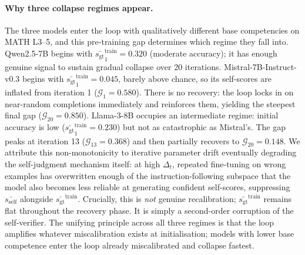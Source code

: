 \documentclass{article}
\newcommand{\gap}{\mathcal{G}}          %
\newcommand{\self}{s_{\text{self}}}     %
\newcommand{\gt}{s_{\text{gt}}}         %
\begin{document}
\paragraph{Why three collapse regimes appear.}
The three models enter the loop with qualitatively different base competencies
on MATH L3--5, and this pre-training gap determines which regime they fall into.
Qwen2.5-7B begins with $\bar{\gt}^\text{train}_1 = 0.320$ (moderate accuracy);
it has enough genuine signal to sustain gradual collapse over 20 iterations.
Mistral-7B-Instruct-v0.3 begins with $\bar{\gt}^\text{train}_1 = 0.045$, barely
above chance, so its self-scores are inflated from iteration 1 ($\gap_1 = 0.580$).
There is no recovery: the loop locks in on near-random completions immediately
and reinforces them, yielding the steepest final gap ($\gap_{20} = 0.850$).
Llama-3-8B occupies an intermediate regime: initial accuracy is low
($\bar{\gt}^\text{train}_1 = 0.230$) but not as catastrophic as Mistral's.
The gap peaks at iteration 13 ($\gap_{13} = 0.368$) and then partially recovers
to $\gap_{20} = 0.148$.
We attribute this non-monotonicity to iterative parameter drift eventually degrading
the self-judgment mechanism itself: at high $\Delta_t$, repeated fine-tuning on
wrong examples has overwritten enough of the instruction-following subspace that the model also
becomes less reliable at generating confident self-scores, suppressing $\bar{\self}$
alongside $\bar{\gt}^\text{train}$.
Crucially, this is \emph{not} genuine recalibration; $\bar{\gt}^\text{train}$
remains flat throughout the recovery phase. It is simply a second-order corruption
of the self-verifier.
The unifying principle across all three regimes is that the loop amplifies
whatever miscalibration exists at initialisation; models with lower base
competence enter the loop already miscalibrated and collapse fastest.
\end{document}
